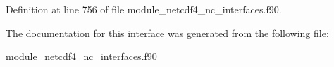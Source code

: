 Definition at line 756 of file module\+\_\+netcdf4\+\_\+nc\+\_\+interfaces.\+f90.



The documentation for this interface was generated from the following file\+:\begin{DoxyCompactItemize}
\item 
\hyperlink{module__netcdf4__nc__interfaces_8f90}{module\+\_\+netcdf4\+\_\+nc\+\_\+interfaces.\+f90}\end{DoxyCompactItemize}
